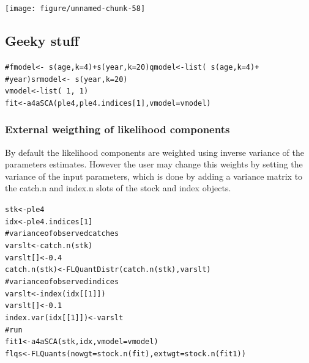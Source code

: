 \documentclass[a4paper,english,10pt]{article}\usepackage[]{graphicx}\usepackage[]{color}
\makeatletter
\newcommand{\hlnum}[1]{\textcolor[rgb]{0.2,0.2,0.2}{#1}}%
\newcommand{\hlcom}[1]{\textcolor[rgb]{0.2,0.267,0.4}{#1}}%
\newcommand{\hlopt}[1]{\textcolor[rgb]{0.2,0.2,0.2}{#1}}%
\newcommand{\hlstd}[1]{\textcolor[rgb]{0,0,0}{#1}}%
\newcommand{\hlkwb}[1]{\textcolor[rgb]{0.361,0.506,0.596}{#1}}%
\newcommand{\hlkwc}[1]{\textcolor[rgb]{0.361,0.506,0.596}{#1}}%
\newcommand{\hlkwd}[1]{\textcolor[rgb]{0.361,0.506,0.596}{#1}}%
\newenvironment{kframe}{%
 \def\at@end@of@kframe{}%
 \ifinner\ifhmode%
  \def\at@end@of@kframe{\end{minipage}}%
  \begin{minipage}{\columnwidth}%
 \fi\fi%
 \def\FrameCommand##1{\hskip\@totalleftmargin \hskip-\fboxsep
 \colorbox{shadecolor}{##1}\hskip-\fboxsep
     \hskip-\linewidth \hskip-\@totalleftmargin \hskip\columnwidth}%
 \MakeFramed {\advance\hsize-\width
   \@totalleftmargin\z@ \linewidth\hsize
   \@setminipage}}%
 {\par\unskip\endMakeFramed%
 \at@end@of@kframe}
\newenvironment{knitrout}{}{} %
\makeatother
\begin{document}
\begin{knitrout}
\color{fgcolor}

{\centering \texttt{[image: figure/unnamed-chunk-58]} 

}



\end{knitrout}


\subsection{Geeky stuff}

\begin{knitrout}
\color{fgcolor}\begin{kframe}
\begin{alltt}
\hlcom{# fmodel <- ~ s(age, k=4) + s(year, k = 20) qmodel <- list( ~ s(age, k=4) +}
\hlcom{# year) srmodel <- ~s(year, k=20)}
\hlstd{vmodel} \hlkwb{<-} \hlkwd{list}\hlstd{(}\hlopt{~}\hlnum{1}\hlstd{,} \hlopt{~}\hlnum{1}\hlstd{)}
\hlstd{fit} \hlkwb{<-} \hlkwd{a4aSCA}\hlstd{(ple4, ple4.indices[}\hlnum{1}\hlstd{],} \hlkwc{vmodel} \hlstd{= vmodel)}
\end{alltt}
\end{kframe}
\end{knitrout}



\subsubsection{External weigthing of likelihood components}

By default the likelihood components are weighted using inverse variance of the parameters estimates. However the user may change this weights by setting the variance of the input parameters, which is done by adding a variance matrix to the catch.n and index.n slots of the stock and index objects. 

\begin{knitrout}
\color{fgcolor}\begin{kframe}
\begin{alltt}
\hlstd{stk} \hlkwb{<-} \hlstd{ple4}
\hlstd{idx} \hlkwb{<-} \hlstd{ple4.indices[}\hlnum{1}\hlstd{]}
\hlcom{# variance of observed catches}
\hlstd{varslt} \hlkwb{<-} \hlkwd{catch.n}\hlstd{(stk)}
\hlstd{varslt[]} \hlkwb{<-} \hlnum{0.4}
\hlkwd{catch.n}\hlstd{(stk)} \hlkwb{<-} \hlkwd{FLQuantDistr}\hlstd{(}\hlkwd{catch.n}\hlstd{(stk), varslt)}
\hlcom{# variance of observed indices}
\hlstd{varslt} \hlkwb{<-} \hlkwd{index}\hlstd{(idx[[}\hlnum{1}\hlstd{]])}
\hlstd{varslt[]} \hlkwb{<-} \hlnum{0.1}
\hlkwd{index.var}\hlstd{(idx[[}\hlnum{1}\hlstd{]])} \hlkwb{<-} \hlstd{varslt}
\hlcom{# run}
\hlstd{fit1} \hlkwb{<-} \hlkwd{a4aSCA}\hlstd{(stk, idx,} \hlkwc{vmodel} \hlstd{= vmodel)}
\hlstd{flqs} \hlkwb{<-} \hlkwd{FLQuants}\hlstd{(}\hlkwc{nowgt} \hlstd{=} \hlkwd{stock.n}\hlstd{(fit),} \hlkwc{extwgt} \hlstd{=} \hlkwd{stock.n}\hlstd{(fit1))}
\end{alltt}
\end{kframe}
\end{knitrout}
\end{document}
